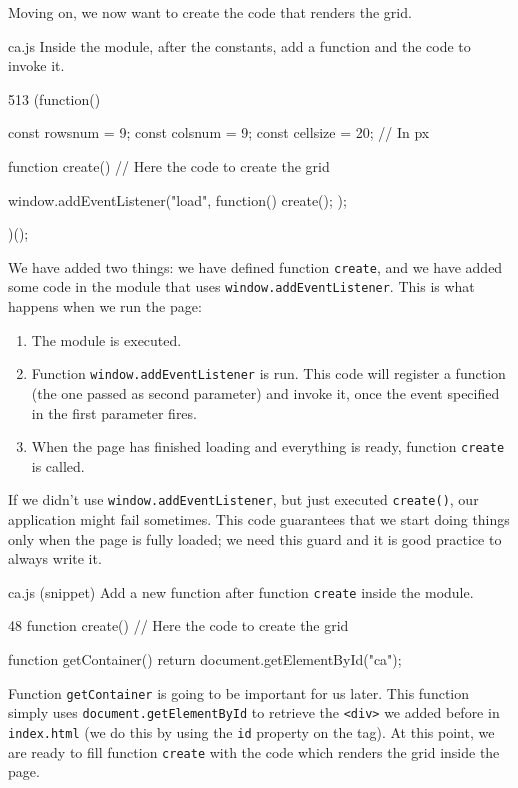 Moving on, we now want to create the code that renders the grid.

\begin{programcode}{ca.js}
Inside the module, after the constants, add a function and the code to invoke it.
\begin{codeh1}{5}{13}
(function(){
  const rowsnum = 9;
  const colsnum = 9;
  const cellsize = 20; // In px

  function create() {
    // Here the code to create the grid
  }

  window.addEventListener("load", function() {
    create();
  });
})();
\end{codeh1}
\end{programcode}

We have added two things: we have defined function \texttt{create}, and we have added some code in
the module that uses \texttt{window.addEventListener}. This is what happens when we run the page:

\begin{enumerate}
\item The module is executed.
\item Function \texttt{window.addEventListener} is run. This code will register a function (the one
passed as second parameter) and invoke it, once the event specified in the first parameter fires.
\item When the page has finished loading and everything is ready, function \texttt{create} is called.
\end{enumerate}

If we didn't use \texttt{window.addEventListener}, but just executed \texttt{create()}, our
application might fail sometimes. This code guarantees that we start doing things only when
the page is fully loaded; we need this guard and it is good practice to always write it.

\begin{programcode}{ca.js (snippet)}
Add a new function after function \texttt{create} inside the module.
\begin{codeh1}{4}{8}
function create() {
  // Here the code to create the grid
}

function getContainer() {
  return document.getElementById("ca");
}
\end{codeh1}
\end{programcode}

Function \texttt{getContainer} is going to be important for us later. This function simply
uses \texttt{document.getElementById} to retrieve the \texttt{<div>} we added before in
\texttt{index.html} (we do this by using the \texttt{id} property on the tag).
At this point, we are ready to fill function
\texttt{create} with the code which renders the grid inside the page.

